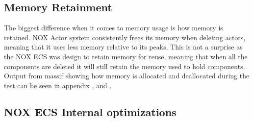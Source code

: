 \subsection{Memory Retainment}
The biggest difference when it comes to memory usage is how memory is retained.
NOX Actor system consistently frees its memory when deleting actors, meaning that it uses less memory relative to its peaks.
This is not a surprise as the NOX ECS was design to retain memory for reuse, meaning that when all the components are deleted
it will still retain the memory used to hold components.
Output from massif showing how memory is allocated and deallocated during the test can be seen in appendix ,
and .

\subsection{NOX ECS Internal optimizations}


